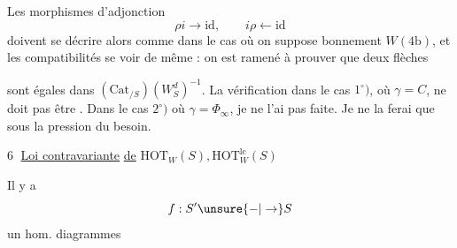 Les morphismes d'adjonction
\[
\rho i\longrightarrow\mathrm{id},\qquad i\rho\longleftarrow\mathrm{id}
\]
doivent se décrire alors comme dans le cas où on suppose  bonnement $W(4\mathrm b)$, et les compatibilités se voir de même : on est ramené à prouver que deux flèches


sont égales dans $(\mathrm{Cat}_{/S})(W_S^d)^{-1}$. La vérification dans le cas $1^\circ)$, où $\gamma=C$, ne doit pas être . Dans le cas $2^\circ)$ où $\gamma=\Phi_\infty$, je ne l'ai pas faite. Je ne la ferai que sous la pression du besoin.

\textcircled{6} \uline{Loi contravariante} \uline{de} $\mathrm{HOT}_W(S),\mathrm{HOT}_W^{\mathrm{lc}}(S)$

Il y a 
\[
f:S'\unsure{\mathbin{-}|\to}S
\]
un hom.  diagrammes


